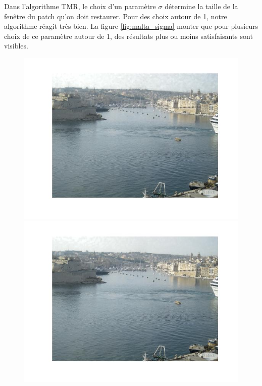 \documentclass{article}
\begin{document}
Dans l'algorithme TMR, le choix d'un paramètre $\sigma$ détermine la taille de la fenêtre du patch qu'on doit restaurer. Pour des choix autour de 1, notre algorithme réagit très bien. La figure \ref{fig:malta_sigma} monter que pour plusieurs choix de ce paramètre autour de 1, des résultats plus ou moins satisfaisants sont visibles.

\begin{figure}
\centering
\begin{minipage}{0.33\textwidth}
\centering
\includegraphics[scale=0.3]{images/malta_sigma_8.jpg}
\end{minipage}%
\begin{minipage}{0.33\textwidth}
\centering
\includegraphics[scale=0.3]{images/malta_sigma_10.jpg}

\end{minipage}
\end{figure}
\end{document}
